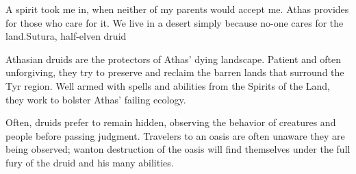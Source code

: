 {A spirit took me in, when neither of my parents would accept me. Athas provides for those who care for it. We live in a desert simply because no-one cares for the land.}{Sutura, half-elven druid}

Athasian druids are the protectors of Athas' dying landscape. Patient and often unforgiving, they try to preserve and reclaim the barren lands that surround the Tyr region. Well armed with spells and abilities from the Spirits of the Land, they work to bolster Athas' failing ecology.

Often, druids prefer to remain hidden, observing the behavior of creatures and people before passing judgment. Travelers to an oasis are often unaware they are being observed; wanton destruction of the oasis will find themselves under the full fury of the druid and his many abilities.

